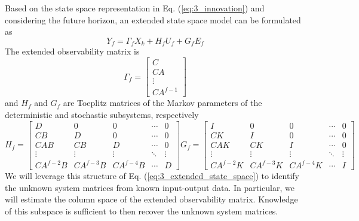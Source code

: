 Based on the state space representation in Eq. (\ref{eq:3_innovation}) and considering the future horizon, an extended state space model can be formulated as
\begin{equation}\label{eq:3_extended_state_space}
Y_f = \Gamma_f X_k + H_f U_f + G_f E_f
\end{equation}
The extended observability matrix is
\begin{equation}\label{eq:3_extended_observability}
\Gamma_f = \begin{bmatrix}C\\ CA\\ \vdots\\ CA^{f-1}\end{bmatrix}
\end{equation}
and $H_f$ and $G_f$ are Toeplitz matrices of the Markov parameters of the deterministic and stochastic subsystems, respectively
\begin{subequations}\label{eq:3_toeplitz}
\begin{equation}
H_f = \begin{bmatrix}
D & 0 & 0 & \cdots & 0\\
CB & D & 0 & \cdots & 0\\
CAB & CB & D & \cdots & 0\\
\vdots & \vdots  & \vdots & \ddots & \vdots\\
CA^{f-2}B & CA^{f-3}B & CA^{f-4}B & \cdots & D
\end{bmatrix}
\end{equation}
\begin{equation}
G_f = \begin{bmatrix}
I & 0 & 0 & \cdots & 0\\
CK & I & 0 & \cdots & 0\\
CAK & CK & I & \cdots & 0\\
\vdots & \vdots  & \vdots & \ddots & \vdots\\
CA^{f-2}K & CA^{f-3}K & CA^{f-4}K & \cdots & I
\end{bmatrix}
\end{equation}
\end{subequations}
We will leverage this structure of Eq. (\ref{eq:3_extended_state_space}) to identify the unknown system matrices from known input-output data. In particular, we will estimate the column space of the extended observability matrix. Knowledge of this subspace is sufficient to then recover the unknown system matrices. 


